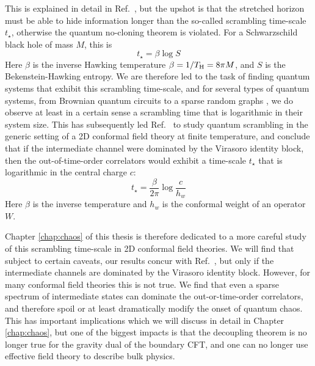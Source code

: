 \documentclass{brownthesis}
\begin{document}
This is explained in detail in Ref.~\cite{Sekino:2008he}, but the upshot is that
the stretched horizon must be able to hide information longer than the so-called
scrambling time-scale $t_\star$, otherwise the quantum no-cloning theorem is violated.
For a Schwarzschild black hole of mass $M$, this is
\[
t_\star = \beta \log S
\]
Here $\beta$ is the inverse Hawking temperature $\beta = 1/T_{\rm H} = 8\pi M$, and
$S$ is the Bekenstein-Hawking entropy. We are therefore led to the task of finding
quantum systems that exhibit this scrambling time-scale, and for several types of
quantum systems, from Brownian quantum circuits \cite{Lashkari:2011yi} to a sparse
random graphs \cite{Lashkari:2011yi, Bentsen:2018uph}, we do observe at least in a
certain sense a scrambling time that is logarithmic in their system size. This has
subsequently led Ref.~\cite{PhysRevLett.115.131603} to study quantum scrambling in
the generic setting of a 2D conformal field theory at finite temperature, and
conclude that if the intermediate channel were dominated by the Virasoro identity
block, then the out-of-time-order correlators would exhibit a time-scale $t_\star$
that is logarithmic in the central charge $c$:
\[
t_\star = \frac{\beta}{2\pi}\log\frac{c}{h_{w}}
\]
Here $\beta$ is the inverse temperature and $h_w$ is the conformal weight of
an operator $W$.

Chapter \ref{chap:chaos} of this thesis is therefore dedicated to a more careful
study of this scrambling time-scale in 2D conformal field theories. We will find that
subject to certain caveats, our results concur with Ref.~\cite{PhysRevLett.115.131603},
but only if the intermediate channels are dominated by the Virasoro identity block.
However, for many conformal field theories this is not true. We find that
even a sparse spectrum of intermediate states can dominate the out-or-time-order
correlators, and therefore spoil or at least dramatically modify the onset of
quantum chaos. This has important implications which we will discuss in detail in
Chapter \ref{chap:chaos}, but one of the biggest impacts is that the decoupling
theorem is no longer true for the gravity dual of the boundary CFT, and one can
no longer use effective field theory to describe bulk physics.
\end{document}
